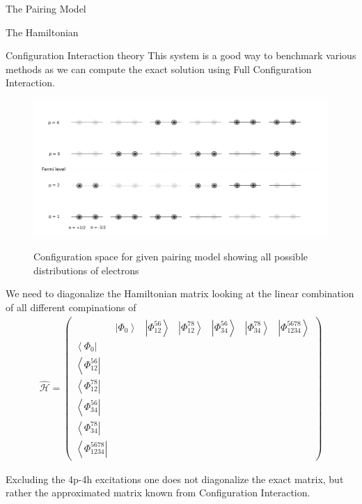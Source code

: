 \documentclass[twoside,english]{uiofysmaster}
\begin{document}
\begin{chapter}{The Pairing Model}
\begin{section}{The Hamiltonian}
	\end{section}


	\begin{section}{Configuration Interaction theory}
		This system is a good way to benchmark various methods as we can compute the exact solution using Full Configuration Interaction. 

		\begin{figure}[h]
			\includegraphics[width=1.1\linewidth]{Figures/Pairing_model2.pdf}
			\label{PairingModel_2}
			\caption{Configuration space for given pairing model showing all possible distributions of electrons}
		\end{figure}

	 	We need to diagonalize the Hamiltonian matrix looking at the linear combination of all different compinations of 
		\begin{align}
			\hat{ \mathcal{H} } = \left(  \begin{matrix}
				& \left| \Phi_0 \right> & \left| \Phi_{12}^{56} \right> & \left| \Phi_{12}^{78} \right> & \left| \Phi_{34}^{56} \right> & \left| \Phi_{34}^{78} \right> & \left| \Phi_{1234}^{5678} \right> \\ 
				\left< \Phi_0 \right| &   &   &   &   &   & \\
				\left< \Phi_{12}^{56} \right| &   &   &   &   &   & \\
				\left< \Phi_{12}^{78} \right| &   &   &   &   &   & \\
				\left< \Phi_{34}^{56} \right| &   &   &   &   &   & \\
				\left< \Phi_{34}^{78} \right| &   &   &   &   &   & \\
				\left< \Phi_{1234}^{5678} \right| &   &   &   &   &   & 
			\end{matrix} \right)
		\end{align}

		Excluding the 4p-4h excitations one does not diagonalize the exact matrix, but rather the approximated matrix known from Configuration Interaction. 


\end{section}
\end{chapter}
\end{document}
